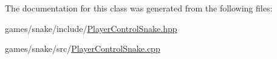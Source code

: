The documentation for this class was generated from the following files\-:\begin{DoxyCompactItemize}
\item 
games/snake/include/\hyperlink{_player_control_snake_8hpp}{Player\-Control\-Snake.\-hpp}\item 
games/snake/src/\hyperlink{_player_control_snake_8cpp}{Player\-Control\-Snake.\-cpp}\end{DoxyCompactItemize}
